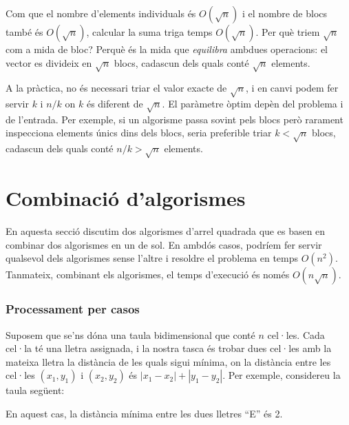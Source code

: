 Com que el nombre d'elements individuals és $O(\sqrt n)$ i el nombre
de blocs també és $O(\sqrt n)$, calcular la suma triga temps $O(\sqrt
n)$.  Per què triem $\sqrt n$ com a mida de bloc? Perquè és la mida
que \emph{equilibra} ambdues operacions: el vector es divideix en
$\sqrt n$ blocs, cadascun dels quals conté $\sqrt n$ elements.

A la pràctica, no és necessari triar el valor exacte de $\sqrt n$, i
en canvi podem fer servir $k$ i $n/k$ on $k$ és diferent de $\sqrt
n$. El paràmetre òptim depèn del problema i de l'entrada. Per exemple,
si un algorisme passa sovint pels blocs però rarament inspecciona
elements únics dins dels blocs, seria preferible triar $k < \sqrt n$
blocs, cadascun dels quals conté $n/k > \sqrt n$ elements.

\section{Combinació d'algorismes}

En aquesta secció discutim dos algorismes d'arrel quadrada que es
basen en combinar dos algorismes en un de sol. En ambdós casos,
podríem fer servir qualsevol dels algorismes sense l'altre i resoldre
el problema en temps $O(n^2)$. Tanmateix, combinant els algorismes, el
temps d'execució és només $O(n\sqrt n)$.

\subsubsection{Processament per casos}

Suposem que se'ns dóna una taula bidimensional que conté $n$
cel·les. Cada cel·la té una lletra assignada, i la nostra tasca és
trobar dues cel·les amb la mateixa lletra la distància de les quals
sigui mínima, on la distància entre les cel·les $(x_1,y_1)$ i
$(x_2,y_2)$ és $|x_1-x_2|+|y_1-y_2|$. Per exemple, considereu la
taula següent:


\begin{center}
\end{center}
En aquest cas, la distància mínima entre les dues lletres ``E'' és 2.

